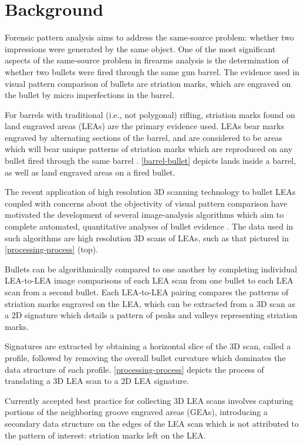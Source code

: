 \documentclass[12pt]{article}
\begin{document}
\section{Background}

Forensic pattern analysis aims to address the same-source problem:
whether two impressions were generated by the same object. One of the
most significant aspects of the same-source problem in firearms analysis
is the determination of whether two bullets were fired through the same
gun barrel. The evidence used in visual pattern comparison of bullets
are striation marks, which are engraved on the bullet by micro
imperfections in the barrel.

For barrels with traditional (i.e., not polygonal) rifling, striation
marks found on land engraved areas (LEAs) are the primary evidence used.
LEAs bear marks engraved by alternating sections of the barrel, and are
considered to be areas which will bear unique patterns of striation
marks which are reproduced on any bullet fired through the same barrel
\cite{AFTE}. \autoref{barrel-bullet} depicts lands inside a barrel, as
well as land engraved areas on a fired bullet.

The recent application of high resolution 3D scanning technology to
bullet LEAs coupled with concerns about the objectivity of visual
pattern comparison have motivated the development of several
image-analysis algorithms which aim to complete automated, quantitative
analyses of bullet evidence
\citep[see][]{DeKinder1, DeKinder2, Bachrach1, Ma1, Chu1, Chu2, Hare1}.
The data used in such algorithms are high resolution 3D scans of LEAs,
such as that pictured in \autoref{processing-process} (top).

Bullets can be algorithmically compared to one another by completing
individual LEA-to-LEA image comparisons of each LEA scan from one bullet
to each LEA scan from a second bullet. Each LEA-to-LEA pairing compares
the patterns of striation marks engraved on the LEA, which can be
extracted from a 3D scan as a 2D signature which details a pattern of
peaks and valleys representing striation marks.

Signatures are extracted by obtaining a horizontal slice of the 3D scan,
called a profile, followed by removing the overall bullet curvature
which dominates the data structure of each profile.
\autoref{processing-process} depicts the process of translating a 3D LEA
scan to a 2D LEA signature.

Currently accepted best practice for collecting 3D LEA scans involves
capturing portions of the neighboring groove engraved areas (GEAs),
introducing a secondary data structure on the edges of the LEA scan
which is not attributed to the pattern of interest: striation marks left
on the LEA.
\end{document}
